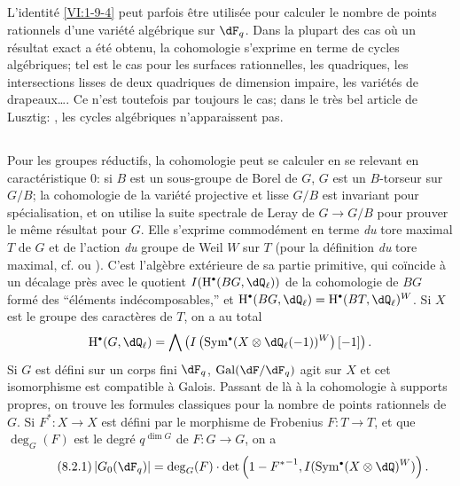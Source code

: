 \subsection{}\label{VI:8-1}

L'identité \ref{VI:1-9-4} peut parfois être utilisée pour calculer 
le nombre de points rationnels d'une variété algébrique sur $\dF_q$. Dans 
la plupart des cas où un résultat exact a été obtenu, la cohomologie 
s'exprime en terme de cycles algébriques; tel est le cas pour les surfaces 
rationnelles, les quadriques, les intersections lisses de deux quadriques de 
dimension impaire, les variétés de drapeaux\ldots. Ce n'est toutefois par 
toujours le cas; dans le très bel article de Lusztig: \cite{lu76}, les cycles 
algébriques n'apparaissent pas. 





\subsection{}\label{VI:8-2}

Pour les groupes réductifs, la cohomologie peut se calculer en se relevant en 
caractéristique $0$: si $B$ est un sous-groupe de Borel de $G$, $G$ est un 
$B$-torseur sur $G/B$; la cohomologie de la variété projective et lisse 
$G/B$ est invariant pour spécialisation, et on utilise la suite spectrale de 
Leray de $G\to G/B$ pour prouver le même résultat pour $G$. Elle s'exprime 
commodément en terme \emph{du} tore maximal $T$ de $G$ et de l'action 
\emph{du} groupe de Weil $W$ sur $T$ (pour la définition \emph{du} tore 
maximal, cf. \cite[VIII \S 2 Rem.2]{bo05} ou \cite[p.105]{dl76}). C'est 
l'algèbre extérieure de sa partie primitive, qui coïncide à un décalage 
près avec le quotient $I(\h^\bullet(B G,\dQ_\ell))$ de la cohomologie de 
$B G$ formé des ``éléments indécomposables,'' et 
$\h^\bullet(B G,\dQ_\ell)=\h^\bullet(B T,\dQ_\ell)^W$. Si $X$ est le groupe des 
caractères de $T$, on a au total 
\[
  \h^\bullet(G,\dQ_\ell) = \bigwedge \left(I\left(\operatorname{Sym}^\bullet(X\otimes \dQ_\ell(-1))^W\right)[-1]\right) \text{.}
\]
Si $G$ est défini sur un corps fini $\dF_q$, $\gal(\dF/\dF_q)$ agit sur $X$ 
et cet isomorphisme est compatible à Galois. Passant de là à la 
cohomologie à supports propres, on trouve les formules classiques pour la 
nombre de points rationnels de $G$. Si $F^\ast:X\to X$ est défini par le 
morphisme de Frobenius $F:T\to T$, et que $\deg_G(F)$ est le degré 
$q^{\dim G}$ de $F:G\to G$, on a 
\begin{equation*}\tag{8.2.1}\label{VI:eq:8-2-1}
  \left|G_0(\dF_q)\right| = \deg_G(F) \cdot \det\left(1-{F^\ast}^{-1},I(\operatorname{Sym}^\bullet(X\otimes \dQ)^W)\right) \text{.}
\end{equation*}

